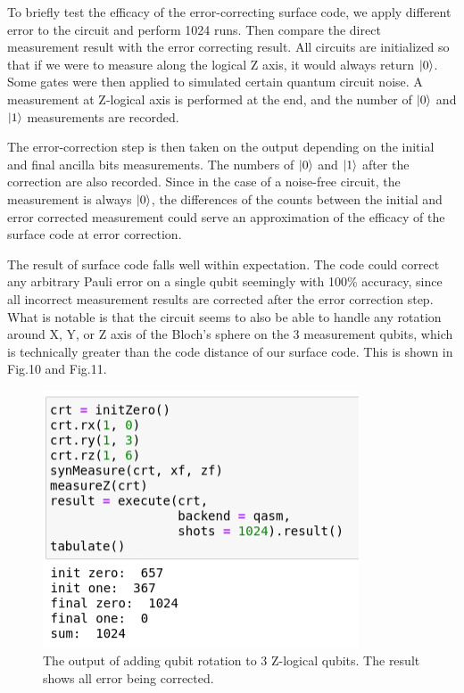 \documentclass{article}
\begin{document}
To briefly test the efficacy of the error-correcting surface code, we apply different error to the circuit and perform 1024 runs. Then compare the direct measurement result with the error correcting result. All circuits are initialized so that if we were to measure along the logical Z axis, it would always return $\ket{0}$. Some gates were then applied to simulated certain quantum circuit noise. A measurement at Z-logical axis is performed at the end, and the number of $\ket{0}$ and $\ket{1}$ measurements are recorded.

The error-correction step is then taken on the output depending on the initial and final ancilla bits measurements. The numbers of $\ket{0}$ and $\ket{1}$ after the correction are also recorded. Since in the case of a noise-free circuit, the measurement is always $\ket{0}$, the differences of the counts between the initial and error corrected measurement could serve an approximation of the efficacy of the surface code at error correction.

The result of surface code falls well within expectation. The code could correct any arbitrary Pauli error on a single qubit seemingly with 100\% accuracy, since all incorrect measurement results are corrected after the error correction step. What is notable is that the circuit seems to also be able to handle any rotation around X, Y, or Z axis of the Bloch's sphere on the 3 measurement qubits, which is technically greater than the code distance of our surface code. This is shown in Fig.10 and Fig.11.

\begin{figure}[p]
    \centering
    \includegraphics[width = 0.5\linewidth]{surface/rxryrz.PNG}
    \caption{The output of adding qubit rotation to 3 Z-logical qubits. The result shows all error being corrected.}
    \label{fig:my_label}
\end{figure}
\end{document}
